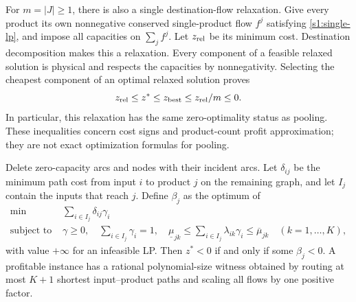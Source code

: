 For $m=|J|\ge1$, there is also a single destination-flow relaxation. Give every product
its own nonnegative conserved single-product flow $f^j$ satisfying
\eqref{s1:single-lp}, and impose all capacities on $\sum_j f^j$.
Let $z_{\rm rel}$ be its minimum cost. Destination decomposition makes
this a relaxation. Every component of a feasible relaxed solution is
physical and respects the capacities by nonnegativity. Selecting the
cheapest component of an optimal relaxed solution proves
\[
 z_{\rm rel}\le z^*\le z_{\rm best}\le z_{\rm rel}/m\le0.
\]
In particular, this relaxation has the same zero-optimality status as
pooling. These inequalities concern cost signs and product-count profit
approximation; they are not exact optimization formulas for pooling.

\begin{theorem}\label{s1:paths}
Delete zero-capacity arcs and nodes with their incident arcs. Let
$\delta_{ij}$ be the minimum path cost from input $i$ to product $j$
on the remaining graph, and let $I_j$ contain the inputs that reach $j$.
Define $\beta_j$ as the optimum of
\begin{align*}
 \min\ &\sum_{i\in I_j}\delta_{ij}\gamma_i\\
 \text{subject to }&\gamma\ge0,\quad\sum_{i\in I_j}\gamma_i=1,\quad
 \underline\mu_{jk}\le\sum_{i\in I_j}\lambda_{ik}\gamma_i
                                  \le\overline\mu_{jk}\quad(k=1,\ldots,K),
\end{align*}
with value $+\infty$ for an infeasible LP. Then $z^*<0$ if and only if
some $\beta_j<0$. A profitable instance has a rational polynomial-size
witness obtained by routing at most $K+1$ shortest input--product paths
and scaling all flows by one positive factor.
\end{theorem}
